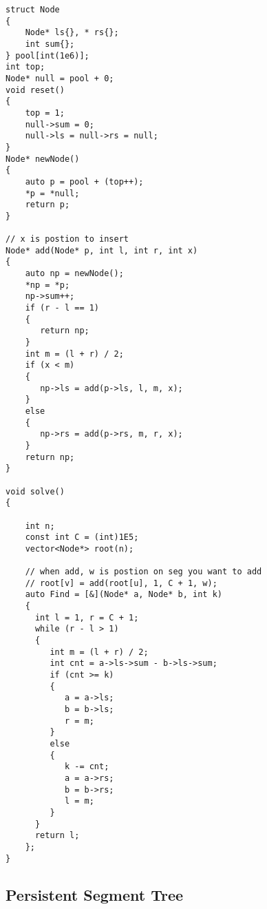 \begin{lstlisting}[style=cpp]
struct Node  
{  
    Node* ls{}, * rs{};  
    int sum{};  
} pool[int(1e6)];  
int top;  
Node* null = pool + 0;  
void reset()  
{  
    top = 1;  
    null->sum = 0;  
    null->ls = null->rs = null;  
}  
Node* newNode()  
{  
    auto p = pool + (top++);  
    *p = *null;  
    return p;  
}  
  
// x is postion to insert  
Node* add(Node* p, int l, int r, int x)  
{  
    auto np = newNode();  
    *np = *p;  
    np->sum++;  
    if (r - l == 1)  
    {  
       return np;  
    }  
    int m = (l + r) / 2;  
    if (x < m)  
    {  
       np->ls = add(p->ls, l, m, x);  
    }  
    else  
    {  
       np->rs = add(p->rs, m, r, x);  
    }  
    return np;  
}  
  
void solve()  
{  
  
    int n;  
    const int C = (int)1E5;  
    vector<Node*> root(n);  
  
    // when add, w is postion on seg you want to add  
    // root[v] = add(root[u], 1, C + 1, w);    
    auto Find = [&](Node* a, Node* b, int k)  
    {  
      int l = 1, r = C + 1;  
      while (r - l > 1)  
      {  
         int m = (l + r) / 2;  
         int cnt = a->ls->sum - b->ls->sum;  
         if (cnt >= k)  
         {  
            a = a->ls;  
            b = b->ls;  
            r = m;  
         }  
         else  
         {  
            k -= cnt;  
            a = a->rs;  
            b = b->rs;  
            l = m;  
         }  
      }  
      return l;  
    };  
}
\end{lstlisting}

\subsection{Persistent Segment Tree}

